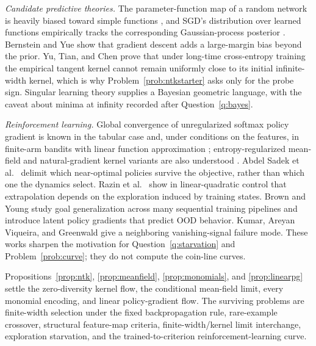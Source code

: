 \documentclass[11pt]{amsart}
\theoremstyle{plain}
\theoremstyle{definition}
\begin{document}
\emph{Candidate predictive theories.} The parameter-function map of a random network is heavily biased toward simple functions \cite{valleperez2019}, and SGD's distribution over learned functions empirically tracks the corresponding Gaussian-process posterior \cite{mingard2021}. Bernstein and Yue \cite{bernstein2022} show that gradient descent adds a large-margin bias beyond the prior. Yu, Tian, and Chen \cite{yu2025} prove that under long-time cross-entropy training the empirical tangent kernel cannot remain uniformly close to its initial infinite-width kernel, which is why Problem~\ref{prob:ntkstarter} asks only for the probe sign. Singular learning theory \cite{watanabe2009} supplies a Bayesian geometric language, with the caveat about minima at infinity recorded after Question~\ref{q:bayes}.

\emph{Reinforcement learning.} Global convergence of unregularized softmax policy gradient is known in the tabular case \cite{mei2020,agarwal2021} and, under conditions on the features, in finite-arm bandits with linear function approximation \cite{lin2025}; entropy-regularized mean-field and natural-gradient kernel variants are also understood \cite{agazzi2021,wang2020}. Abdel Sadek et al.~\cite{sadek2025} delimit which near-optimal policies survive the objective, rather than which one the dynamics select. Razin et al.~\cite{razin2024} show in linear-quadratic control that extrapolation depends on the exploration induced by training states. Brown and Young \cite{brown2026} study goal generalization across many sequential training pipelines and introduce latent policy gradients that predict OOD behavior. Kumar, Areyan Viqueira, and Greenwald \cite{kumar2026} give a neighboring vanishing-signal failure mode. These works sharpen the motivation for Question~\ref{q:starvation} and Problem~\ref{prob:curve}; they do not compute the coin-line curves.

Propositions~\ref{prop:ntk}, \ref{prop:meanfield}, \ref{prop:monomials}, and \ref{prop:linearpg} settle the zero-diversity kernel flow, the conditional mean-field limit, every monomial encoding, and linear policy-gradient flow. The surviving problems are finite-width selection under the fixed backpropagation rule, rare-example crossover, structural feature-map criteria, finite-width/kernel limit interchange, exploration starvation, and the trained-to-criterion reinforcement-learning curve.
\end{document}
